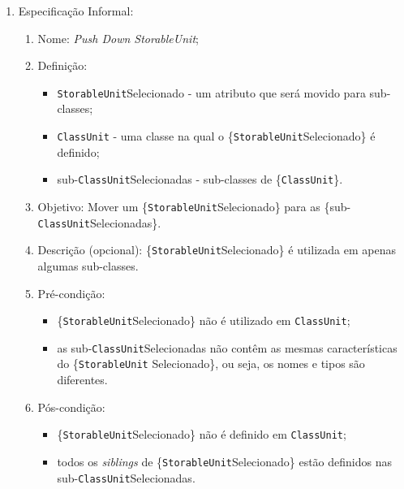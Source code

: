 \begin{enumerate}
	\item Especificação Informal:
		\begin{enumerate}
			\item Nome: \textit{Push Down StorableUnit};
			\item Definição:
			    \begin{itemize}
			        \item \texttt{StorableUnit}Selecionado - um atributo que será movido para sub-classes;
			        \item \texttt{ClassUnit} - uma classe na qual o \{\texttt{StorableUnit}Selecionado\} é definido;
			        \item sub-\texttt{ClassUnit}Selecionadas - sub-classes de \{\texttt{ClassUnit}\}.
			    \end{itemize}
			\item Objetivo: Mover um \{\texttt{StorableUnit}Selecionado\} para as \{sub-\texttt{ClassUnit}Selecionadas\}.
			\item Descrição (opcional): \{\texttt{StorableUnit}Selecionado\} é utilizada em apenas algumas sub-classes.
			\item Pré-condição:
			    \begin{itemize}
			        \item \{\texttt{StorableUnit}Selecionado\} não é utilizado em \texttt{ClassUnit};
			        \item as sub-\texttt{ClassUnit}Selecionadas não contêm as mesmas características do \{\texttt{StorableUnit} Selecionado\}, ou seja, os nomes e tipos são diferentes.
			    \end{itemize}
			\item Pós-condição:
			    \begin{itemize}
			        \item \{\texttt{StorableUnit}Selecionado\} não é definido em \texttt{ClassUnit};
			        \item todos os \textit{siblings} de \{\texttt{StorableUnit}Selecionado\} estão definidos nas sub-\texttt{ClassUnit}Selecionadas.
			    \end{itemize}

\end{enumerate}
\end{enumerate}
